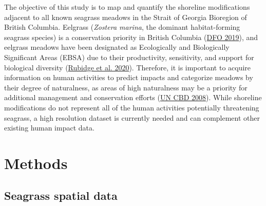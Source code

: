 \documentclass[12pt]{article}\usepackage[]{graphicx}\usepackage[]{color}
\begin{document}
The objective of this study is to map and quantify the shoreline modifications adjacent to all known seagrass meadows in the Strait of Georgia Bioregion of British Columbia. Eelgrass (\emph{Zostera marina}, the dominant habitat-forming seagrass species) is a conservation priority in British Columbia (\protect\hyperlink{ref-DFO2019}{DFO 2019}), and eelgrass meadows have been designated as Ecologically and Biologically Significant Areas (EBSA) due to their productivity, sensitivity, and support for biological diversity (\protect\hyperlink{ref-Rubidge2020}{Rubidge et al. 2020}). Therefore, it is important to acquire information on human activities to predict impacts and categorize meadows by their degree of naturalness, as areas of high naturalness may be a priority for additional management and conservation efforts (\protect\hyperlink{ref-UNCBD2008}{UN CBD 2008}). While shoreline modifications do not represent all of the human activities potentially threatening seagrass, a high resolution dataset is currently needed and can complement other existing human impact data.

\hypertarget{methods}{%
\section{Methods}\label{methods}}

\hypertarget{seagrass-spatial-data}{%
\subsection{Seagrass spatial data}\label{seagrass-spatial-data}}
\end{document}
